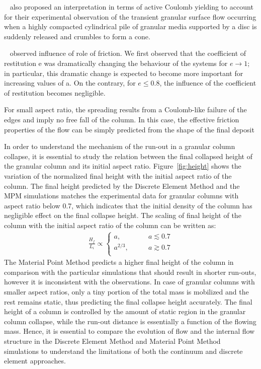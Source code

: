 ~\citet{Daerr1999} also proposed an interpretation in terms
of active Coulomb yielding to account for their experimental
observation of the transient granular surface flow occurring
when a highly compacted cylindrical pile of granular media
supported by a disc is suddenly released and crumbles to
form a cone.

~\citet{Staron2006a} observed influence of role of friction. We first observed 
that the coefficient of restitution e was dramatically changing the behaviour 
of the systems for $e\longrightarrow 1$; in particular, this dramatic change is 
expected to become more important for increasing values of a. On the contrary, 
for $e \le 0.8$, the influence of the coefficient of restitution becomes 
negligible.

For small aspect ratio, the spreading results from a Coulomb-like
failure of the edges and imply no free fall of the column. In this case, the 
effective friction properties of the flow can be simply predicted from the 
shape of the final deposit

In order to understand the mechanism of the run-out in a granular column 
collapse, it is essential to study the relation between the final collapsed 
height of the granular column and its initial aspect ratio. 
Figure~\ref{fig:height} shows the variation of the normalized final height with 
the initial aspect ratio of the column. The final height predicted by the 
Discrete Element Method and the MPM simulations matches the experimental data 
for 
granular columns with aspect ratio below 0.7, which indicates that the initial 
density of the column has negligible effect on the final collapse height. The 
scaling of final height of the column with the initial aspect ratio of the 
column can be written as:
\begin{align}
\frac{H_{\textit{f}}}{L_{\textit{i}}} \propto  
\begin{cases}
\textit{a}, \qquad & \textit{a}\lesssim0.7 \\
\textit{a}^{2/3}, \qquad & \textit{a}\gtrsim0.7 \\
\end{cases}
\end{align}
The Material Point Method predicts a higher final height of the column in 
comparison with the particular simulations that should result in shorter 
run-outs, however it is inconsistent with the observations. In case of granular 
columns with smaller aspect ratios, only a tiny portion of the total mass is 
mobilized and the rest remains static, thus predicting the final collapse 
height accurately. The final height of a column is controlled by the amount of 
static region in the granular column collapse, while the run-out distance is 
essentially a function of the flowing mass. Hence, it is essential to compare 
the evolution of flow and the internal flow structure in the Discrete Element 
Method 
and Material Point Method simulations to understand the limitations of both the 
continuum and discrete element approaches.

